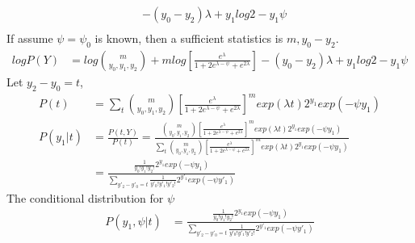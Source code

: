 \documentclass[11pt]{article} %
\begin{document}
\begin{itemize}
\begin{align*}
		& - (y_0- y_2) \lambda + y_1 log 2 - y_1 \psi\\
	\end{align*} 
	If assume $\psi = \psi_0$ is known, then a sufficient statistics is $m, y_0-y_2$.
	\begin{align*}
		log P(Y)  &= log {m \choose y_0, y_1, y_2} + m log\left[ \frac{e^{\lambda}}{1+ 2e^{\lambda-\psi} + e^{2\lambda}} \right]
		- (y_0- y_2) \lambda + y_1 log 2 - y_1 \psi
	\end{align*}   
	Let $y_2-y_0 =t$, 
	\begin{align*}
		P(t)  &= \sum_{t} {m \choose y_0, y_1, y_2} \left[ \frac{e^{\lambda}}{1+ 2e^{\lambda-\psi} + e^{2\lambda}} \right]^m
		exp(\lambda t)  2^{y_1} exp(-\psi {y_1})\\
		P(y_1|t)  &=  \frac{P(t, Y)}{P(t)} = \frac{{m \choose y_0, y_1, y_2}  \left[ \frac{e^{\lambda}}{1+ 2e^{\lambda-\psi} + e^{2\lambda}} \right]^m exp(\lambda t)  2^{y_1} exp(-\psi {y_1})}{ \sum_{t} {m \choose y_0, y_1, y_2} \left[ \frac{e^{\lambda}}{1+ 2e^{\lambda-\psi} + e^{2\lambda}} \right]^m
			exp(\lambda t)  2^{y_1}  exp(-\psi {y_1})} \\
		&= \frac{\frac{1}{y_0!y_1!y_2!}2^{y_1}exp(-\psi {y_1}) }{\sum_{y'_2-y'_0=t} \frac{1}{y'_0!y'_1!y'_2!}2^{y'_1} exp(-\psi {y'_1})}
	\end{align*} 
	The conditional distribution for $\psi$
	\begin{align*}
		P(y_1, \psi |t)  &=  \frac{\frac{1}{y_0!y_1!y_2!}2^{y_1}exp(-\psi {y_1}) }{\sum_{y'_2-y'_0=t} \frac{1}{y'_0!y'_1!y'_2!}2^{y'_1} exp(-\psi {y'_1})}
	\end{align*} 
	

\end{itemize}
\end{document}

